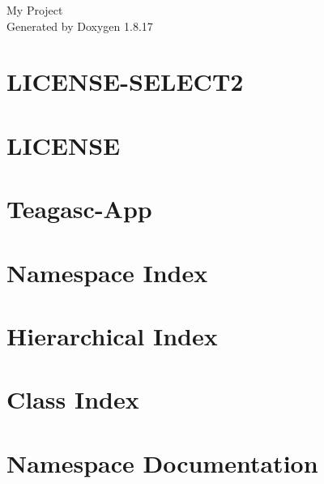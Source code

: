 \let\mypdfximage\pdfximage\def\pdfximage{\immediate\mypdfximage}\documentclass[twoside]{book}
\newcommand{\+}{\discretionary{\mbox{\scriptsize$\hookleftarrow$}}{}{}}
\newcommand{\clearemptydoublepage}{%
  \newpage{\pagestyle{empty}\cleardoublepage}%
}
\begin{document}
\hypersetup{pageanchor=false,
             bookmarksnumbered=true,
             pdfencoding=unicode
            }
\begin{titlepage}
\vspace*{7cm}
\begin{center}%
{\Large My Project }\\
\vspace*{1cm}
{\large Generated by Doxygen 1.8.17}\\
\end{center}
\end{titlepage}
\clearemptydoublepage
{}
\tableofcontents
\clearemptydoublepage
{}
\hypersetup{pageanchor=true}

\chapter{L\+I\+C\+E\+N\+S\+E-\/\+S\+E\+L\+E\+C\+T2}
\label{md_static_admin_css_vendor_select2_LICENSE-SELECT2}

\chapter{L\+I\+C\+E\+N\+SE}
\label{md_static_admin_js_vendor_select2_LICENSE}

\chapter{Teagasc-\/\+App}
\label{md_Teagasc-App_README}

\chapter{Namespace Index}

\chapter{Hierarchical Index}

\chapter{Class Index}

\chapter{Namespace Documentation}








\end{document}
